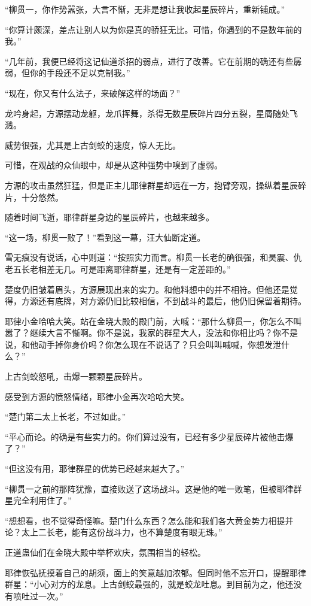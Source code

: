 \begin{this_body}
“柳贯一，你作势嚣张，大言不惭，无非是想让我收起星辰碎片，重新铺成。”

“你算计颇深，差点让别人以为你是真的骄狂无比。可惜，你遇到的不是数年前的我。”

“几年前，我便已经将这记仙道杀招的弱点，进行了改善。它在前期的确还有些孱弱，但你的手段还不足以克制我。”

“现在，你又有什么法子，来破解这样的场面？”

龙吟身起，方源摆动龙躯，龙爪挥舞，杀得无数星辰碎片四分五裂，星屑随处飞溅。

威势很强，尤其是上古剑蛟的速度，惊人无比。

可惜，在观战的众仙眼中，却是从这种强势中嗅到了虚弱。

方源的攻击虽然狂猛，但是正主儿耶律群星却远在一方，抱臂旁观，操纵着星辰碎片，十分悠然。

随着时间飞逝，耶律群星身边的星辰碎片，也越来越多。

“这一场，柳贯一败了！”看到这一幕，汪大仙断定道。

雪无痕没有说话，心中则道：“按照实力而言。柳贯一长老的确很强，和昊震、仇老五长老相差无几。可是距离耶律群星，还是有一定差距的。”

楚度仍旧皱着眉头，方源展现出来的实力。和他料想中的并不相符。但他还是觉得，方源还有底牌，对方源仍旧比较相信，不到战斗的最后，他仍旧保留着期待。

耶律小金哈哈大笑。站在金晓大殿的殿门前，大喊：“那什么柳贯一，你怎么不叫嚣了？继续大言不惭啊。你不是说，我家的群星大人，没法和你相比吗？你不是说，和他动手掉你身价吗？你怎么现在不说话了？只会叫叫喊喊，你想发泄什么？”

上古剑蛟怒吼，击爆一颗颗星辰碎片。

感受到方源的愤怒情绪，耶律小金再次哈哈大笑。

“楚门第二太上长老，不过如此。”

“平心而论。的确是有些实力的。你们算过没有，已经有多少星辰碎片被他击爆了？”

“但这没有用，耶律群星的优势已经越来越大了。”

“柳贯一之前的那阵犹豫，直接败送了这场战斗。这是他的唯一败笔，但被耶律群星完全利用住了。”

“想想看，也不觉得奇怪嘛。楚门什么东西？怎么能和我们各大黄金势力相提并论？太上二长老，能有这份战斗力，也不算楚度有眼无珠。”

正道蛊仙们在金晓大殿中举杯欢庆，氛围相当的轻松。

耶律恢弘抚摸着自己的胡须，面上的笑意越加浓郁。但同时他不忘开口，提醒耶律群星：“小心对方的龙息。上古剑蛟最强的，就是蛟龙吐息。到目前为之，他还没有喷吐过一次。”


\end{this_body}
